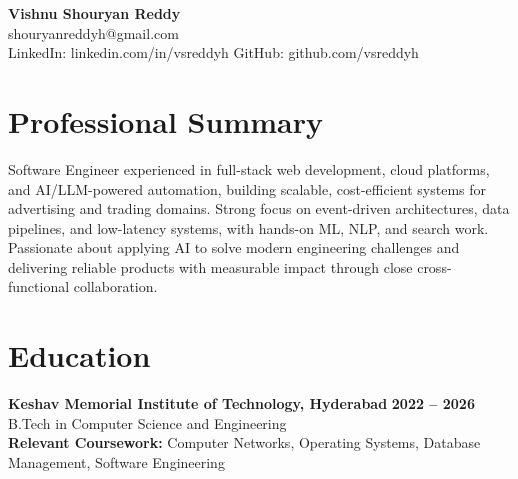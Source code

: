 \documentclass[a4paper,11pt]{article}
\newcommand{\resumeSubheading}[4]{%
  \textbf{#1} \hfill \textbf{#2} \\
{#3} \hfill {#4}
}
\begin{document}
\pagestyle{empty}
\raggedbottom
\addtolength{\textheight}{2\baselineskip}
\small

\begin{center}
  {\LARGE \textbf{Vishnu Shouryan Reddy}}\\[0.3em]
  shouryanreddyh@gmail.com \\[0.3em]
  LinkedIn: linkedin.com/in/vsreddyh \textbar{} GitHub: github.com/vsreddyh
\end{center}
\vspace{-0.8em}

\section*{Professional Summary}

Software Engineer experienced in full-stack web development, cloud platforms, and AI/LLM-powered automation, building scalable, cost-efficient systems for advertising and trading domains. Strong focus on event-driven architectures, data pipelines, and low-latency systems, with hands-on ML, NLP, and search work. Passionate about applying AI to solve modern engineering challenges and delivering reliable products with measurable impact through close cross-functional collaboration.

\section*{Education}

\resumeSubheading
{Keshav Memorial Institute of Technology, Hyderabad}{2022 -- 2026}
{B.Tech in Computer Science and Engineering}{} \\
\textbf{Relevant Coursework:} Computer Networks, Operating Systems, Database Management, Software Engineering


\end{document}
